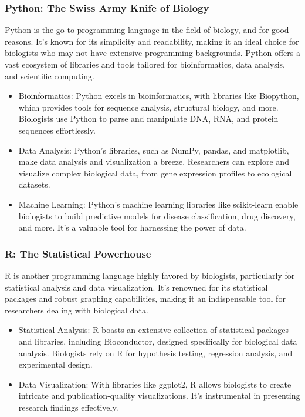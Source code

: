 \documentclass[
]{book}
\begin{document}
\hypertarget{python-the-swiss-army-knife-of-biology}{%
\subsubsection{Python: The Swiss Army Knife of Biology}\label{python-the-swiss-army-knife-of-biology}}

Python is the go-to programming language in the field of biology, and for good reasons. It's known for its simplicity and readability, making it an ideal choice for biologists who may not have extensive programming backgrounds. Python offers a vast ecosystem of libraries and tools tailored for bioinformatics, data analysis, and scientific computing.

\begin{itemize}
\item
  Bioinformatics: Python excels in bioinformatics, with libraries like Biopython, which provides tools for sequence analysis, structural biology, and more. Biologists use Python to parse and manipulate DNA, RNA, and protein sequences effortlessly.
\item
  Data Analysis: Python's libraries, such as NumPy, pandas, and matplotlib, make data analysis and visualization a breeze. Researchers can explore and visualize complex biological data, from gene expression profiles to ecological datasets.
\item
  Machine Learning: Python's machine learning libraries like scikit-learn enable biologists to build predictive models for disease classification, drug discovery, and more. It's a valuable tool for harnessing the power of data.
\end{itemize}

\hypertarget{r-the-statistical-powerhouse}{%
\subsubsection{R: The Statistical Powerhouse}\label{r-the-statistical-powerhouse}}

R is another programming language highly favored by biologists, particularly for statistical analysis and data visualization. It's renowned for its statistical packages and robust graphing capabilities, making it an indispensable tool for researchers dealing with biological data.

\begin{itemize}
\item
  Statistical Analysis: R boasts an extensive collection of statistical packages and libraries, including Bioconductor, designed specifically for biological data analysis. Biologists rely on R for hypothesis testing, regression analysis, and experimental design.
\item
  Data Visualization: With libraries like ggplot2, R allows biologists to create intricate and publication-quality visualizations. It's instrumental in presenting research findings effectively.
\end{itemize}
\end{document}
